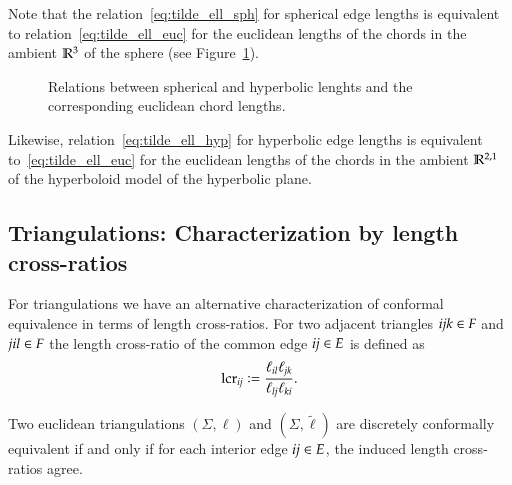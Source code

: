 \documentclass[Thesis]{subfiles}
\begin{document}
\begin{remark}
  Note that the relation~\eqref{eq:tilde_ell_sph} for spherical edge
  lengths is equivalent to relation~\eqref{eq:tilde_ell_euc} for the
  euclidean lengths of the chords in the ambient $\mathbb R^{3}$ of the
  sphere (see Figure~\ref{fig:geometries}).
  \begin{figure}
    \centering \resizebox{0.6\textwidth}{!}{
      
       }
    \caption{Relations between spherical and hyperbolic lenghts and
      the corresponding euclidean chord lengths.}
    \label{fig:geometries}
  \end{figure}
  Likewise, relation~\eqref{eq:tilde_ell_hyp} for hyperbolic edge
  lengths is equivalent to~\eqref{eq:tilde_ell_euc} for the euclidean
  lengths of the chords in the ambient $\mathbb R^{2,1}$ of the hyperboloid
  model of the hyperbolic plane.
\end{remark}


\subsection{Triangulations: Characterization by length cross-ratios}
\label{sec:triangulations}

For triangulations we have an alternative characterization of conformal equivalence in terms of length cross-ratios. For two adjacent triangles $\it ijk\in F$ and $\it jil\in F$ the length cross-ratio of the common edge $\it ij\in E$ is defined as
\begin{equation}
\operatorname{lcr}_{\it ij}\vcentcolon=\frac{\ell_{\it il}\ell_{\it jk}}{\ell_{\it lj}\ell_{\it ki}}.
\end{equation}

\begin{proposition}
Two euclidean triangulations $(\Sigma, \ell)$ and $(\Sigma, \tilde \ell)$ are discretely conformally equivalent if and only if for each interior edge $\it ij\in E$, the induced length cross-ratios agree.
\end{proposition}
\end{document}
